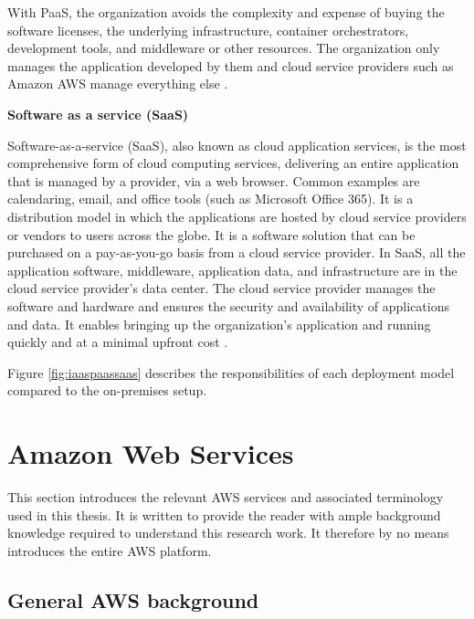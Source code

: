 \par With PaaS, the organization avoids the complexity and expense of buying the software licenses, the underlying infrastructure, container orchestrators, development tools, and middleware or other resources. The organization only manages the application developed by them and cloud service providers such as Amazon AWS manage everything else \cite{9}.

\textbf{Software as a service (SaaS)}
\par Software-as-a-service (SaaS), also known as cloud application services, is the most comprehensive form of cloud computing services, delivering an entire application that is managed by a provider, via a web browser. Common examples are calendaring, email, and office tools (such as Microsoft Office 365). It is a distribution model in which the applications are hosted by cloud service providers or vendors to users across the globe. It is a software solution that can be purchased on a pay-as-you-go basis from a cloud service provider. In SaaS, all the application software, middleware, application data, and infrastructure are in the cloud service provider’s data center. The cloud service provider manages the software and hardware and ensures the security and availability of applications and data. It enables bringing up the organization’s application and running quickly and at a minimal upfront cost \cite{15}.

\par Figure \ref{fig:iaaspaassaas} describes the responsibilities of each deployment model compared to the on-premises setup.

\section{Amazon Web Services}
\par This section introduces the relevant AWS services and associated terminology used in this thesis. It is written to provide the reader with ample background knowledge required to understand this research work. It therefore by no means introduces the entire AWS platform.

\subsection{General AWS background}

